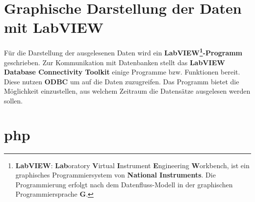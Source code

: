 \section{Graphische Darstellung der Daten mit LabVIEW}
Für die Darstellung der ausgelesenen Daten wird ein \textbf{LabVIEW\footnote{\textbf{LabVIEW}: \textbf{Lab}oratory \textbf{V}irtual \textbf{I}nstrument \textbf{E}ngineering \textbf{W}orkbench, ist ein graphisches Programmiersystem von \textbf{National Instruments}. Die Programmierung erfolgt nach dem Datenfluss-Modell in der graphischen Programmiersprache \textbf{G}.}-Programm} geschrieben.
Zur Kommunikation mit Datenbanken stellt das \textbf{LabVIEW Database Connectivity Toolkit} einige Programme bzw. Funktionen bereit. Diese nutzen \textbf{ODBC} um auf die Daten zuzugreifen. Das Programm bietet die Möglichkeit einzustellen, aus welchem Zeitraum die Datensätze ausgelesen werden sollen.




\section{php}